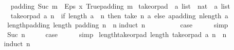 \begin{isabellebody}
\ \ {\isachardoublequoteopen}padding\ {\isacharparenleft}Suc\ m{\isacharparenright}\ {\isacharequal}\ {\isacharparenleft}Eps\ {\isacharparenleft}{\isasymlambda}x{\isachardot}\ True{\isacharparenright}{\isacharparenright}{\isacharhash}{\isacharparenleft}padding\ m{\isacharparenright}{\isachardoublequoteclose}\isanewline
\isanewline
{}\isamarkupfalse%
\ take{\isacharunderscore}or{\isacharunderscore}pad\ {\isacharcolon}{\isacharcolon}\ {\isachardoublequoteopen}{\isacharprime}a\ list\ {\isasymRightarrow}\ nat\ {\isasymRightarrow}\ {\isacharprime}a\ list{\isachardoublequoteclose}\ \isanewline
\ \ {\isachardoublequoteopen}take{\isacharunderscore}or{\isacharunderscore}pad\ a\ n\ {\isacharequal}\ {\isacharparenleft}if\ length\ a\ {\isasymge}\ n\ then\ take\ n\ a\ else\ a{\isacharat}{\isacharparenleft}padding\ {\isacharparenleft}n{\isacharminus}length\ a{\isacharparenright}{\isacharparenright}{\isacharparenright}{\isachardoublequoteclose}\isanewline
\isanewline
{}\isamarkupfalse%
\ length{\isacharunderscore}padding{\isacharcolon}\ {\isachardoublequoteopen}length\ {\isacharparenleft}padding\ n{\isacharparenright}\ {\isacharequal}\ n{\isachardoublequoteclose}\isanewline
%
\isadelimproof
%
\endisadelimproof
%
\isatagproof
{}\isamarkupfalse%
{\isacharparenleft}induct\ n{\isacharparenright}\isanewline
\ \ \isamarkupfalse%
\ {}\isanewline
\ \ \isamarkupfalse%
\ \isamarkupfalse%
\ {\isacharquery}case\isanewline
\ \ \ \ \isamarkupfalse%
\ simp\isanewline
{}\isamarkupfalse%
\isanewline
\ \ \isamarkupfalse%
\ {\isacharparenleft}Suc\ n{\isacharparenright}\isanewline
\ \ \isamarkupfalse%
\ \isamarkupfalse%
\ {\isacharquery}case\isanewline
\ \ \ \ \isamarkupfalse%
\ simp\isanewline
{}\isamarkupfalse%
%
\endisatagproof
{\isafoldproof}%
%
\isadelimproof
\isanewline
%
\endisadelimproof
\isanewline
{}\isamarkupfalse%
\ length{\isacharunderscore}take{\isacharunderscore}or{\isacharunderscore}pad{\isacharcolon}\ {\isachardoublequoteopen}length\ {\isacharparenleft}take{\isacharunderscore}or{\isacharunderscore}pad\ a\ n{\isacharparenright}\ {\isacharequal}\ n{\isachardoublequoteclose}\isanewline
%
\isadelimproof
%
\endisadelimproof
%
\isatagproof
{}\isamarkupfalse%
{\isacharparenleft}induct\ n{\isacharparenright}\isanewline
\ \ \isamarkupfalse%
\ {}\isanewline
\ \ \isamarkupfalse%

\end{isabellebody}
